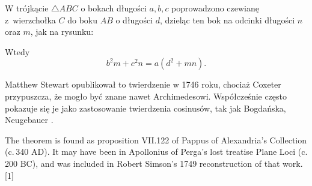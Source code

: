 \begin{theorem}[Stewarta, 1746]
	W trójkącie $\triangle ABC$ o bokach długości $a, b, c$ poprowadzono czewianę z~wierzchołka $C$ do boku $AB$ o długości $d$, dzieląc ten bok na odcinki długości $n$ oraz $m$, jak na rysunku:
	\begin{center}
\begin{comment}
    \begin{tikzpicture}[scale=.4]
        \tkzDefPoint(0, 0){A}
		\tkzDefPoint(3.25, 3.25){d}

		\tkzDefPoint(6, 0){AB}
        \tkzDefPoint(10, 0){B}
        \tkzDefPoint(1, 7){C}
        \tkzDefPoint(35:4.75){CC}
		\tkzDrawSegments(C,AB)
        \tkzDrawPolygon[line width=0.3mm](A,B,C)

        \tkzLabelPoint[below left](A){$A$}
        \tkzLabelPoint[below right](B){$B$}
        \tkzLabelPoint[above](C){$C$}

        \tkzLabelPoint(d){$d$}

		\tkzDrawPoints[size=3,color=black,fill=black!80](A,B,C,AB)
		\tkzDrawSegment[dim={$\,\,c\,\,$,-16pt,transform shape}](A,B)
		\tkzDrawSegment[dim={$\,\,n\,\,$,-8pt,transform shape}](A,AB)
		\tkzDrawSegment[dim={$\,\,m\,\,$,-8pt,transform shape}](AB,B)
		\tkzDrawSegment[dim={$\,\,b\,\,$,8pt,transform shape,sloped}](A,C)
		\tkzDrawSegment[dim={$\,\,a\,\,$,-8pt,transform shape,sloped}](B,C)
    \end{tikzpicture}
\end{comment}
    \end{center}
	Wtedy
	\begin{equation}
		b^2 m + c^2 n = a (d^2 + mn).
	\end{equation}
\end{theorem}

Matthew Stewart opublikował to twierdzenie w 1746 roku, chociaż Coxeter przypuszcza, że mogło być znane nawet Archimedesowi.
%
%
Współcześnie często pokazuje się je jako zastosowanie twierdzenia cosinusów, tak jak Bogdańska, Neugebauer \cite[s. 90-91]{neugebauer_2018}.	

\begin{corollary}
	The theorem is found as proposition VII.122 of Pappus of Alexandria's Collection (c. 340 AD). It may have been in Apollonius of Perga's lost treatise Plane Loci (c. 200 BC), and was included in Robert Simson's 1749 reconstruction of that work.[1]
\end{corollary}

